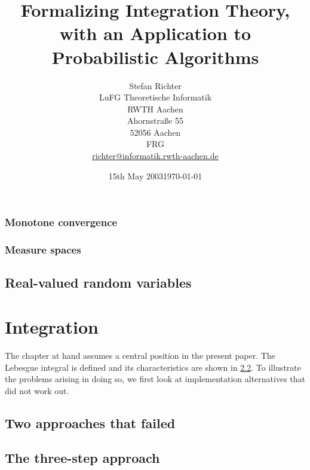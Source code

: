 \documentclass[11pt,a4paper]{report}
\date{15th May 2003}
\begin{document}
\title{Formalizing Integration Theory, with an Application to
  Probabilistic Algorithms}


\author{Stefan Richter\\
  LuFG Theoretische Informatik\\
  RWTH Aachen\\
  Ahornstraße 55\\
  52056 Aachen\\
  FRG\\
  \url{richter@informatik.rwth-aachen.de}}

\date{\today}
      
\maketitle

\pagestyle{headings}
\tableofcontents

% 
\newpage
\pagestyle{headings}

  
\subsection{Monotone convergence}
\label{sec:monconv}

\subsection{Measure spaces}
\label{sec:measure-spaces}

\newpage
\section{Real-valued random variables}
\label{sec:realrandvar}

\chapter{Integration}
\label{cha:integration}

The chapter at hand assumes a central position in the present paper. The Lebesgue
integral is defined and its characteristics are shown in
\ref{sec:stepwise-approach}. To illustrate the problems arising in
doing so, we first look at implementation alternatives that did not
work out. 

\section{Two approaches that failed}
\label{sec:two-approaches-that}

\section{The three-step approach}
\label{sec:stepwise-approach}

 
\begin{flushleft}


\end{flushleft}
\end{document}
